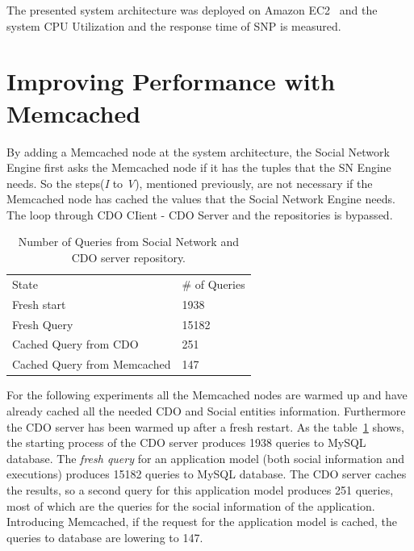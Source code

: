 The presented system architecture was deployed on Amazon EC2~\cite{amazon_url} and the system CPU Utilization and the response time of SNP is measured.

\section{Improving Performance with Memcached}
\label{sec:eval_memcache}
By adding a Memcached node at the system architecture, the Social Network Engine first asks the Memcached node if it has the tuples that the SN Engine needs. So the steps(\emph{I} to \emph{V}), mentioned previously, are not necessary if the Memcached node has cached the values that the Social Network Engine needs. The loop through CDO CIient - CDO Server and the repositories is bypassed. 

\begin{table}[]
\centering
\caption{Number of Queries from Social Network and CDO server repository.}
\label{tab:num_of_queries}
\begin{tabular}{ll}
State        & \# of Queries \\
Fresh start  & 1938          \\
Fresh Query  & 15182         \\
Cached Query from CDO & 251           \\
Cached Query from Memcached & 147  
\end{tabular}
\end{table} 

For the following experiments all the Memcached nodes are warmed up and have already cached all the needed CDO and Social entities information. Furthermore the CDO server has been warmed up after a fresh restart. As the table~\ref{tab:num_of_queries} shows,
the starting process of the CDO server produces 1938 queries to MySQL database. The \emph{fresh query} for an application model (both social information and executions) produces 15182 queries to MySQL database. The CDO server caches the results, so a second query for this application model produces 251 queries, most of which are the queries for the social information of the application. Introducing Memcached, if the request for the application model is cached, the queries to database are lowering to 147.  

